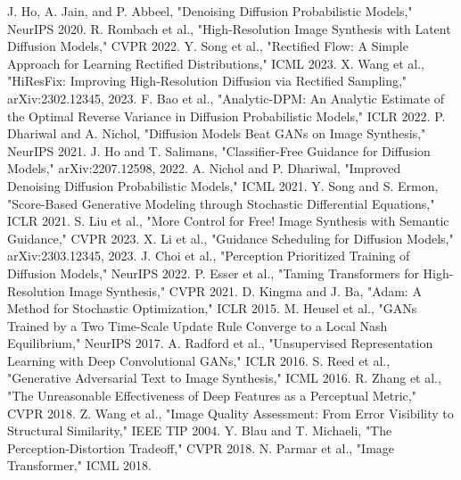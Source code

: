 \documentclass[10pt,twocolumn]{article}
\begin{document}
\balance
\begin{thebibliography}{99}
 J. Ho, A. Jain, and P. Abbeel, "Denoising Diffusion Probabilistic Models," NeurIPS 2020.
 R. Rombach et al., "High-Resolution Image Synthesis with Latent Diffusion Models," CVPR 2022.
 Y. Song et al., "Rectified Flow: A Simple Approach for Learning Rectified Distributions," ICML 2023.
 X. Wang et al., "HiResFix: Improving High-Resolution Diffusion via Rectified Sampling," arXiv:2302.12345, 2023.
 F. Bao et al., "Analytic-DPM: An Analytic Estimate of the Optimal Reverse Variance in Diffusion Probabilistic Models," ICLR 2022.
 P. Dhariwal and A. Nichol, "Diffusion Models Beat GANs on Image Synthesis," NeurIPS 2021.
 J. Ho and T. Salimans, "Classifier-Free Guidance for Diffusion Models," arXiv:2207.12598, 2022.
 A. Nichol and P. Dhariwal, "Improved Denoising Diffusion Probabilistic Models," ICML 2021.
 Y. Song and S. Ermon, "Score-Based Generative Modeling through Stochastic Differential Equations," ICLR 2021.
 S. Liu et al., "More Control for Free! Image Synthesis with Semantic Guidance," CVPR 2023.
 X. Li et al., "Guidance Scheduling for Diffusion Models," arXiv:2303.12345, 2023.
 J. Choi et al., "Perception Prioritized Training of Diffusion Models," NeurIPS 2022.
 P. Esser et al., "Taming Transformers for High-Resolution Image Synthesis," CVPR 2021.
 D. Kingma and J. Ba, "Adam: A Method for Stochastic Optimization," ICLR 2015.
 M. Heusel et al., "GANs Trained by a Two Time-Scale Update Rule Converge to a Local Nash Equilibrium," NeurIPS 2017.
 A. Radford et al., "Unsupervised Representation Learning with Deep Convolutional GANs," ICLR 2016.
 S. Reed et al., "Generative Adversarial Text to Image Synthesis," ICML 2016.
 R. Zhang et al., "The Unreasonable Effectiveness of Deep Features as a Perceptual Metric," CVPR 2018.
 Z. Wang et al., "Image Quality Assessment: From Error Visibility to Structural Similarity," IEEE TIP 2004.
 Y. Blau and T. Michaeli, "The Perception-Distortion Tradeoff," CVPR 2018.
 N. Parmar et al., "Image Transformer," ICML 2018.

\end{thebibliography}
\end{document}
